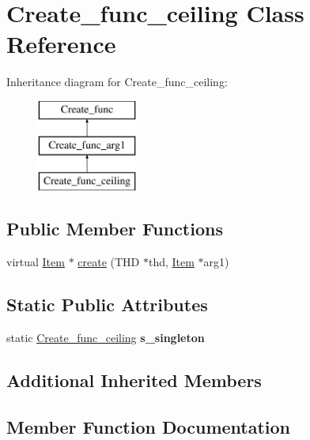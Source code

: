 \hypertarget{classCreate__func__ceiling}{}\section{Create\+\_\+func\+\_\+ceiling Class Reference}
\label{classCreate__func__ceiling}
Inheritance diagram for Create\+\_\+func\+\_\+ceiling\+:\begin{figure}[H]
\begin{center}
\leavevmode
\includegraphics[height=3.000000cm]{classCreate__func__ceiling}
\end{center}
\end{figure}
\subsection*{Public Member Functions}
\begin{DoxyCompactItemize}
\item 
virtual \mbox{\hyperlink{classItem}{Item}} $\ast$ \mbox{\hyperlink{classCreate__func__ceiling_aa328fa37da3b2f7d5cdc3111eded6c71}{create}} (T\+HD $\ast$thd, \mbox{\hyperlink{classItem}{Item}} $\ast$arg1)
\end{DoxyCompactItemize}
\subsection*{Static Public Attributes}
\begin{DoxyCompactItemize}
\item 
\mbox{\label{classCreate__func__ceiling_a3616bc81d08c9ce73bbdc3e6afa2e5a5}} 
static \mbox{\hyperlink{classCreate__func__ceiling}{Create\+\_\+func\+\_\+ceiling}} {\bfseries s\+\_\+singleton}
\end{DoxyCompactItemize}
\subsection*{Additional Inherited Members}


\subsection{Member Function Documentation}
\mbox{\label{classCreate__func__ceiling_aa328fa37da3b2f7d5cdc3111eded6c71}} 
